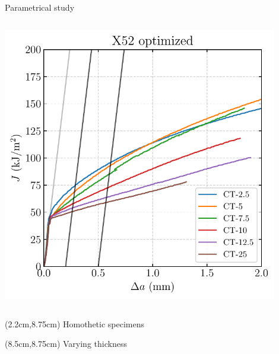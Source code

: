 \documentclass[9pt]{beamer}
\begin{document}
\begin{frame}{Parametrical study}
\begin{columns}
        \centering
        \includegraphics[width=0.9\textwidth]{Images/plot_12_5_Jda_1_2__1_4.pdf}
    \end{columns}

    \begin{textblock*}{5cm}(2.2cm,8.75cm)
        \small Homothetic specimens
    \end{textblock*}

    \begin{textblock*}{5cm}(8.5cm,8.75cm)
        \small Varying thickness
    \end{textblock*}

\end{frame}

\end{document}
